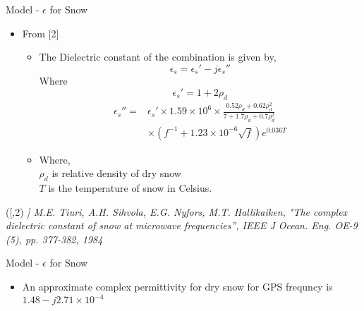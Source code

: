 \documentclass{beamer}
\newenvironment{reference}[2]{%
  \begin{textblock*}{\textwidth}(#1,#2) 
      \footnotesize\it\bgroup\color{red!50!black}}{\egroup\end{textblock*}}
\begin{document}
\begin{frame}{Model - $\epsilon$ for Snow}
\begin{itemize}
  \item From [2] 
    \begin{itemize}
      \item The Dielectric constant of the combination is given by,
        \begin{equation*}
          \epsilon_s = \epsilon_s'  - j\epsilon_s''
        \end{equation*}
        Where
        \begin{equation*}
            \epsilon_s' = 1 + 2 \rho_d
        \end{equation*}
        \begin{align*}
          \epsilon_s'' = &\epsilon_s' \times 1.59 \times 10^6 \times \frac{0.52\rho_d + 0.62\rho_d^2}{7 + 1.7\rho_d + 0.7\rho_d^2}\\
          & \times (f^{-1} + 1.23 \times 10^{-6}\sqrt{f})e^{0.036 T}
        \end{align*}
      \item Where, \\$\rho_d$ is relative density of dry snow \\$T$ is the temperature of snow in Celsius.
    \end{itemize}
\end{itemize}

\begin{reference}{4mm}{85mm}
 [2] M.E. Tiuri, A.H. Sihvola, E.G. Nyfors, M.T. Hallikaiken, "The complex dielectric constant of snow at microwave frequencies'', IEEE J Ocean. Eng. OE-9 (5), pp. 377-382, 1984
\end{reference}

\end{frame}

\begin{frame}{Model - $\epsilon$ for Snow}
\begin{itemize}
      \item An approximate complex permittivity for dry snow for GPS frequncy is $1.48-j2.71\times 10^{-4}$
\end{itemize}
\end{frame}
\end{document}
